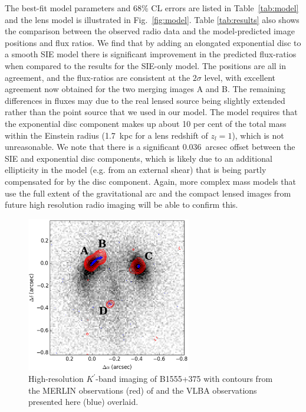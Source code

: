 \documentclass[a4paper,fleqn,usenatbib,useAMS]{mnras}
\begin{document}
The best-fit model parameters and 68\% CL errors are listed in Table~\ref{tab:model} and the lens model is illustrated in Fig.~\ref{fig:model}. Table \ref{tab:results} also shows the comparison between the observed radio data and the model-predicted image positions and flux ratios. We find that by adding an elongated exponential disc to a smooth SIE model there is significant improvement in the predicted flux-ratios when compared to the results for the SIE-only model. 
The positions are all in agreement, and the flux-ratios are consistent at the $2\sigma$ level, with excellent agreement now obtained for the two merging images A and B. The remaining differences in fluxes may due to the real lensed source being slightly extended rather than the point source that we used in our model. The model requires that the exponential disc component makes up about 10 per cent of the total mass within the Einstein radius (1.7~kpc for a lens redshift of $z_l = 1$), which is not unreasonable. We note that there is a significant 0.036~arcsec offset between the SIE and exponential disc components, which is likely due to an additional ellipticity in the model (e.g. from an external shear) that is being partly compensated for by the disc component. Again, more complex mass models that use the full extent of the gravitational arc and the compact lensed images from future high resolution radio imaging will be able to confirm this.

\begin{figure}
\includegraphics[width=72mm]{fig2_twocontour_b.eps}
\caption{High-resolution $K^\prime$-band imaging of B1555+375 with contours from the MERLIN observations (red) of \citet{Marlow99} and the VLBA observations presented here (blue) overlaid.}
\label{fig:merlin}
\end{figure}
\end{document}
